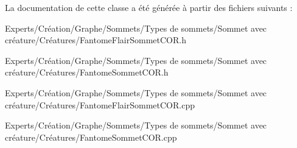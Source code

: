 La documentation de cette classe a été générée à partir des fichiers suivants \+:\begin{DoxyCompactItemize}
\item 
Experts/\+Création/\+Graphe/\+Sommets/\+Types de sommets/\+Sommet avec créature/\+Créatures/Fantome\+Flair\+Sommet\+C\+O\+R.\+h\item 
Experts/\+Création/\+Graphe/\+Sommets/\+Types de sommets/\+Sommet avec créature/\+Créatures/Fantome\+Sommet\+C\+O\+R.\+h\item 
Experts/\+Création/\+Graphe/\+Sommets/\+Types de sommets/\+Sommet avec créature/\+Créatures/Fantome\+Flair\+Sommet\+C\+O\+R.\+cpp\item 
Experts/\+Création/\+Graphe/\+Sommets/\+Types de sommets/\+Sommet avec créature/\+Créatures/Fantome\+Sommet\+C\+O\+R.\+cpp\end{DoxyCompactItemize}
